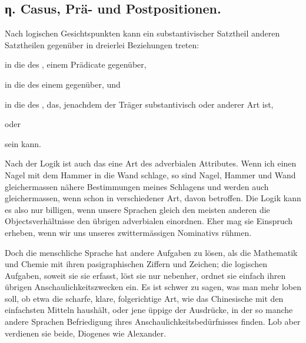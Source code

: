 \label{sp.461}

\subsection*{η. Casus, Prä- und Postpositionen.}\label{IV.IV.Iceta}

Nach logischen Gesichtspunkten kann ein substantivischer Satztheil anderen Satztheilen gegenüber in dreierlei Beziehungen treten:

\begin{compactenum}[1.]
\item in die des , einem Prädicate gegenüber,

\item in die des  einem  gegenüber, und

\item in die des , das, jenachdem der Träger substantivisch oder anderer Art ist,
\begin{compactenum}[a.]
\item {} oder

\item {} sein kann.
\end{compactenum}
\end{compactenum}

Nach der Logik ist auch das  eine Art des adverbialen Attributes. Wenn ich einen Nagel mit dem Hammer in die Wand schlage, so sind Nagel, Hammer und Wand gleichermassen nähere Bestimmungen meines Schlagens und werden auch gleichermassen, wenn schon in verschiedener Art, davon betroffen. Die Logik kann es also nur billigen, wenn unsere Sprachen gleich den meisten anderen die Objectsverhältnisse den übrigen adverbialen einordnen. Eher mag sie Einspruch erheben, wenn wir uns unseres zwittermässigen Nominativs rühmen.

\label{fp.441}

Doch die menschliche Sprache hat andere Aufgaben zu lösen, als die Mathematik und Chemie mit ihren pasigraphischen Ziffern und Zeichen; die logischen Aufgaben, soweit sie sie erfasst, löst sie nur nebenher, ordnet sie einfach ihren übrigen Anschaulichkeitszwecken ein. Es ist schwer zu sagen, was man mehr loben soll, ob etwa die scharfe, klare, folgerichtige Art, wie das Chinesische mit den einfachsten Mitteln haushält, oder jene üppige  der Ausdrücke, in der so manche andere Sprachen Befriedigung ihres Anschaulichkeitsbedürfnisses finden. Lob aber verdienen sie beide, Diogenes wie Alexander.

